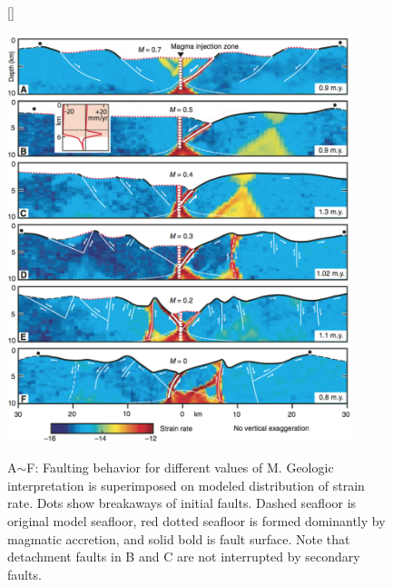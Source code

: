 \begin{figure}[H]
[\FBwidth]
{\caption{\small A$\sim$F: Faulting behavior for different values of M. Geologic interpretation is superimposed on modeled distribution of strain rate. Dots show breakaways of initial faults. Dashed seafloor is original model seafloor, red dotted seafloor is formed dominantly by magmatic accretion, and solid bold is fault surface. Note that detachment faults in B and C are not interrupted by secondary faults. \citep{Tucholke2008}}}
 {\includegraphics[width=10cm]{./Figures/fig_Intro6_1.png}} 
 \label{fig_Intro6_1}
\end{figure}

